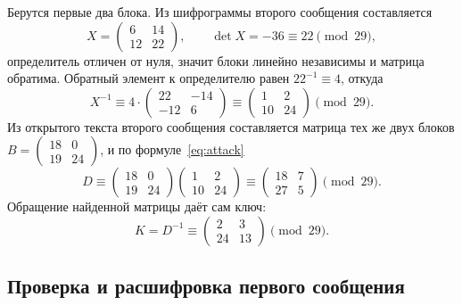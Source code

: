 \documentclass[a4paper,14pt]{extarticle}
\begin{document}
Берутся первые два блока. Из шифрограммы второго сообщения составляется
\begin{equation}
  X = \begin{pmatrix} 6 & 14 \\ 12 & 22 \end{pmatrix}, \qquad \det X = -36 \equiv 22 \pmod{29},
\end{equation}
определитель отличен от нуля, значит блоки линейно независимы и матрица обратима.
Обратный элемент к определителю равен $22^{-1} \equiv 4$, откуда
\begin{equation}
  X^{-1} \equiv 4 \cdot \begin{pmatrix} 22 & -14 \\ -12 & 6 \end{pmatrix} \equiv \begin{pmatrix} 1 & 2 \\ 10 & 24 \end{pmatrix} \pmod{29}.
\end{equation}
Из открытого текста второго сообщения составляется матрица тех же двух блоков
$B = \begin{pmatrix} 18 & 0 \\ 19 & 24 \end{pmatrix}$, и по формуле~\eqref{eq:attack}
\begin{equation}
  D \equiv \begin{pmatrix} 18 & 0 \\ 19 & 24 \end{pmatrix}\begin{pmatrix} 1 & 2 \\ 10 & 24 \end{pmatrix} \equiv \begin{pmatrix} 18 & 7 \\ 27 & 5 \end{pmatrix} \pmod{29}.
\end{equation}
Обращение найденной матрицы даёт сам ключ:
\begin{equation}
  K = D^{-1} \equiv \begin{pmatrix} 2 & 3 \\ 24 & 13 \end{pmatrix} \pmod{29}.
\end{equation}

\subsection{Проверка и расшифровка первого сообщения}
\end{document}
